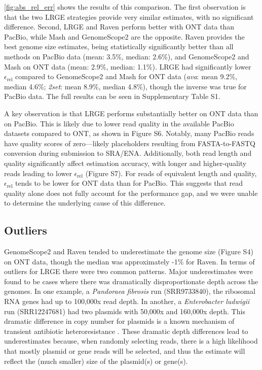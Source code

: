 \documentclass[unnumsec,webpdf,modern,large]{oup-authoring-template}
\theoremstyle{thmstyleone}%
\theoremstyle{thmstyletwo}%
\theoremstyle{thmstylethree}%
\newcommand{\lrge}{LRGE}
\newcommand{\relerr}{$\epsilon_{\text{rel}}$}
\newcommand{\ava}{\textit{ava}}
\newcommand{\twoset}{\textit{2set}}
\begin{document}
\autoref{fig:abs_rel_err} shows the results of this comparison. The first observation is that the two \lrge{} strategies provide very similar estimates, with no significant difference. Second, \lrge{} and Raven perform better with ONT data than PacBio, while Mash and GenomeScope2 are the opposite. Raven provides the best genome size estimates, being statistically significantly better than all methods on PacBio data (mean: 3.5\%, median: 2.6\%), and GenomeScope2 and Mash on ONT data (mean: 2.9\%, median: 1.1\%). \lrge{} had significantly lower \relerr{} compared to GenomeScope2 and Mash for ONT data (\ava{}: mean 9.2\%, median 4.6\%; \twoset{}: mean 8.9\%, median 4.8\%), though the inverse was true for PacBio data. The full results can be seen in Supplementary Table S1.

A key observation is that \lrge{} performs substantially better on ONT data than on PacBio. This is likely due to lower read quality in the available PacBio datasets compared to ONT, as shown in Figure S6. Notably, many PacBio reads have quality scores of zero—likely placeholders resulting from FASTA-to-FASTQ conversion during submission to SRA/ENA. Additionally, both read length and quality significantly affect estimation accuracy, with longer and higher-quality reads leading to lower \relerr{} (Figure S7). For reads of equivalent length and quality, \relerr{} tends to be lower for ONT data than for PacBio. This suggests that read quality alone does not fully account for the performance gap, and we were unable to determine the underlying cause of this difference.


\subsection{Outliers}
\label{sec:outliers}

GenomeScope2 and Raven tended to underestimate the genome size (Figure S4) on ONT data, though the median was approximately -1\% for Raven. In terms of outliers for \lrge{} there were two common patterns. Major underestimates were found to be cases where there was dramatically disproportionate depth across the genomes. In one example, a \textit{Pandoraea fibrosis} run (SRR9733840), the ribosomal RNA genes had up to 100,000x read depth. In another, a \textit{Enterobacter ludwigii} run (SRR12247681) had two plasmids with 50,000x and 160,000x depth. This dramatic difference in copy number for plasmids is a known mechanism of transient antibiotic heteroresistance \citep{nicoloff_three_2024}. These dramatic depth differences lead to underestimates because, when randomly selecting reads, there is a high likelihood that mostly plasmid or gene reads will be selected, and thus the estimate will reflect the (much smaller) size of the plasmid(s) or gene(s).
\end{document}
